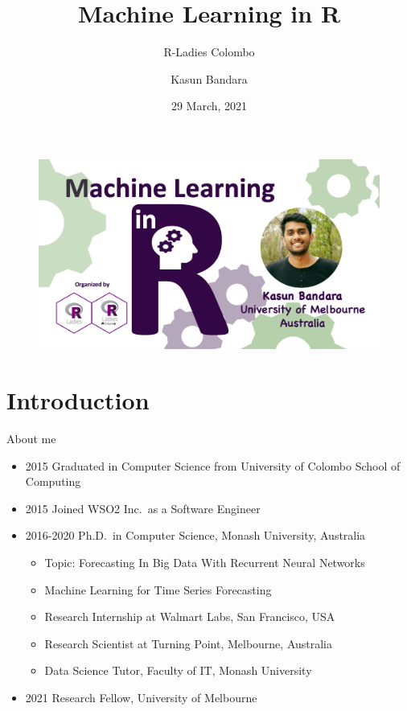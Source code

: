 \documentclass[12pt,ignorenonframetext,]{beamer}
\title[]{Machine Learning in R}
\subtitle{R-Ladies Colombo}
\author[
        Kasun Bandara
    ]{Kasun Bandara}
\institute[
    ]{
    Melbourne Centre for Data Science, University of Melbourne, Australia.
    }
\date[
      29 March, 2021
  ]{
      29 March, 2021
        }
\providecommand{\tightlist}{%
  \setlength{\itemsep}{0pt}\setlength{\parskip}{0pt}}
\begin{document}
  \begin{frame}[plain]
  \titlepage
  \end{frame}



\begin{frame}

\begin{figure}
\includegraphics[scale=0.22]{images/kasun}
\end{figure}

\end{frame}

\hypertarget{introduction}{%
\section{Introduction}\label{introduction}}

\begin{frame}{About me}
\protect\hypertarget{about-me}{}

\begin{itemize}
\tightlist
\item
  2015 Graduated in Computer Science from University of Colombo School
  of Computing
\item
  2015 Joined WSO2 Inc.~as a Software Engineer
\item
  2016-2020 Ph.D.~in Computer Science, Monash University, Australia

  \begin{itemize}
  \tightlist
  \item
    Topic: Forecasting In Big Data With Recurrent Neural Networks
  \item
    Machine Learning for Time Series Forecasting
  \item
    Research Internship at Walmart Labs, San Francisco, USA
  \item
    Research Scientist at Turning Point, Melbourne, Australia
  \item
    Data Science Tutor, Faculty of IT, Monash University
  \end{itemize}
\item
  2021 Research Fellow, University of Melbourne
\end{itemize}

\end{frame}
\end{document}
